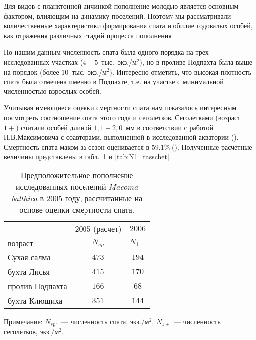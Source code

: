 Для видов с планктонной личинкой пополнение молодью является основным фактором, влияющим на динамику поселений.
Поэтому мы рассматривали количественные характеристики формирования спата и обилие годовалых особей, как отражения различных стадий процесса пополнения.

По нашим данным численность спата была одного порядка на трех исследованных участках ($4-5$~тыс.~экз./м$^2$), но в проливе Подпахта была выше на порядок (более $10$~тыс.~экз./м$^2$). 
Интересно отметить, что высокая плотность спата была отмечена именно в Подпахте, т.е. на участке с минимальной численностью взрослых особей. 

Учитывая имеющиеся оценки смертности спата нам показалось интересным посмотреть соотношение спата этого года и сеголетков. 
Сеголетками (возраст $1+$) считали особей длиной $1,1-2,0$~мм в соответствии с работой Н.В.Максимовича с соавторами, выполненной в исследованной акватории (\cite{Maximovich_et_al_1992}). 
Смертность спата маком за сезон оценивается в $59.1$\% (\cite{Burkovskiy_et_al_1998}). Полученные расчетные величины представлены в табл.~\ref{tab:spat_rasschet} и \ref{tab:N1_rasschet}.

\begin{table}[p]
\caption{Предположительное пополнение исследованных поселений \textit{Macoma balthica} в $2005$ году, рассчитанные на основе оценки смертности спата.}
\label{tab:spat_rasschet}
\begin{center}
\begin{tabular}{|l|c|c|}
\hline
                & $2005$ (расчет) & $2006$ \\ 
возраст         & $N_{sp}$      & $N_{1+}$  \\ \hline
Сухая салма     & $473$           & $194$  \\ \hline
бухта Лисья     & $415$           & $170$  \\ \hline
пролив Подпахта & $166$           & $68$   \\ \hline
бухта Клющиха   & $351$           & $144$  \\ \hline
\end{tabular}
\end{center}
	\footnotesize{Примечание: $N_{sp}$.~--- численность спата, экз./м$^2$, $N_{1+}$~--- численность сеголетков, экз./м$^2$.}

\end{table}


